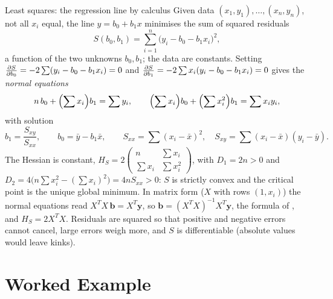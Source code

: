 \begin{rulebox}{Least squares: the regression line by calculus}
Given data $(x_1,y_1),\dots,(x_n,y_n)$, not all $x_i$ equal, the line
$y=b_0+b_1x$ minimises the sum of squared residuals
\[
  S(b_0,b_1)=\sum_{i=1}^{n}\bigl(y_i-b_0-b_1x_i\bigr)^{2},
\]
a function of the two unknowns $b_0,b_1$; the data are constants.
Setting $\frac{\partial S}{\partial b_0}=-2\sum(y_i-b_0-b_1x_i)=0$ and
$\frac{\partial S}{\partial b_1}=-2\sum x_i(y_i-b_0-b_1x_i)=0$ gives the \emph{normal equations}
\[
  n\,b_0+\Bigl(\sum x_i\Bigr)b_1=\sum y_i,\qquad
  \Bigl(\sum x_i\Bigr)b_0+\Bigl(\sum x_i^{2}\Bigr)b_1=\sum x_iy_i ,
\]
with solution
\[
  b_1=\frac{S_{xy}}{S_{xx}},\qquad b_0=\bar y-b_1\bar x,\qquad
  S_{xx}=\sum(x_i-\bar x)^{2},\quad S_{xy}=\sum(x_i-\bar x)(y_i-\bar y).
\]
The Hessian is constant,
$H_S=2\begin{pmatrix}n&\sum x_i\\\sum x_i&\sum x_i^{2}\end{pmatrix}$, with
$D_1=2n>0$ and $D_2=4\bigl(n\sum x_i^{2}-(\sum x_i)^{2}\bigr)=4nS_{xx}>0$:
$S$ is strictly convex and the critical point is the unique global minimum.
In matrix form ($X$ with rows $(1,x_i)$) the normal equations read
$X^{T}X\,\mathbf{b}=X^{T}\mathbf{y}$, so $\mathbf{b}=(X^{T}X)^{-1}X^{T}\mathbf{y}$,
the formula of , and $H_S=2X^{T}X$. Residuals are squared so that
positive and negative errors cannot cancel, large errors weigh more, and $S$
is differentiable (absolute values would leave kinks).
\end{rulebox}

\section{Worked Example}

